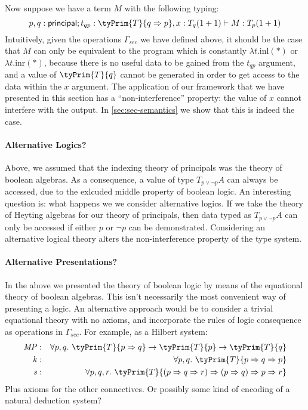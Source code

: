 Now suppose we have a term $M$ with the following typing:
\begin{displaymath}
  p,q:\mathsf{principal}; t_{qp} : \tyPrim{T}{q \Rightarrow p}, x : T_q (1 + 1) \vdash M : T_p (1 + 1)
\end{displaymath}
Intuitively, given the operations $\Gamma_{\mathit{sec}}$ we have
defined above, it should be the case that $M$ can only be equivalent
to the program which is constantly $\lambda t. \mathrm{inl}(*)$ or
$\lambda t. \mathrm{inr}(*)$, because there is no useful data to be
gained from the $t_{qp}$ argument, and a value of $\tyPrim{T}{q}$
cannot be generated in order to get access to the data within the $x$
argument. The application of our framework that we have presented in
this section has a ``non-interference'' property: the value of $x$
cannot interfere with the output. In \autoref{sec:sec-semantics} we
show that this is indeed the case.

\paragraph{Alternative Logics?}
Above, we assumed that the indexing theory of principals was the
theory of boolean algebras. As a consequence, a value of type $T_{p
  \lor \lnot p}A$ can always be accessed, due to the exlcuded middle
property of boolean logic. An interesting question is: what happens we
we consider alternative logics. If we take the theory of Heyting
algebras for our theory of principals, then data typed as $T_{p \lor
  \lnot p}A$ can only be accessed if either $p$ or $\lnot p$ can be
demonstrated. Considering an alternative logical theory alters the
non-interference property of the type system.

\paragraph{Alternative Presentations?}
In the above we presented the theory of boolean logic by means of the
equational theory of boolean algebras. This isn't necessarily the most
convenient way of presenting a logic. An alternative approach would be
to consider a trivial equational theory with no axioms, and
incorporate the rules of logic consequence as operations in
$\Gamma_{\mathit{sec}}$. For example, as a Hilbert system:
\begin{eqnarray*}
  \mathit{MP} & : & \forall p,q.\ \tyPrim{T}{p \Rightarrow q} \to \tyPrim{T}{p} \to \tyPrim{T}{q} \\
  \mathit{k} & : & \forall p,q.\ \tyPrim{T}{p \Rightarrow q \Rightarrow p} \\
  \mathit{s} & : & \forall p,q,r.\ \tyPrim{T}{(p \Rightarrow q \Rightarrow r) \Rightarrow (p \Rightarrow q) \Rightarrow p \Rightarrow r}
\end{eqnarray*}
Plus axioms for the other connectives.  Or possibly some kind of
encoding of a natural deduction system?


